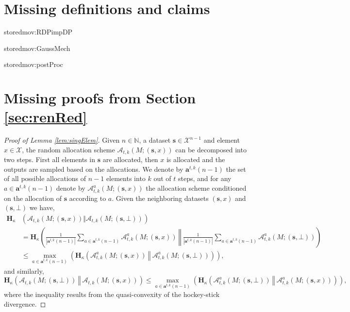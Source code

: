 \documentclass{article}
\newcommand{\showstored}[1]{\csname stored#1\endcsname}
\theoremstyle{plain}
\theoremstyle{definition}
\newcommand{\naturals}{\mathbb{N}}
\newcommand{\alg}{M}
\newcommand{\domain}{\mathcal{X}}
\newcommand{\dataset}{\boldsymbol{s}}
\newcommand{\HockeyStick}[1]{\boldsymbol{H}_{#1}}
\newcommand{\HockeyStickDiv}[3]{\HockeyStick{#1}\left(#2 ~\left\Vert~ #3 \right. \right)}
\newcommand{\allocFunc}[3]{\mathcal{A}_{#1}\left(#2; #3\right)}
\begin{document}
\section{Missing definitions and claims} \label{apd:prem}

\showstored{mov:RDPimpDP}

\showstored{mov:GaussMech}

\showstored{mov:postProc}

\fi

\section{Missing proofs from Section \ref{sec:renRed}} \label{apd:renRed}

\begin{proof}[Proof of Lemma \ref{lem:singElem}]
    Given $n \in \naturals$, a dataset $\dataset \in \domain^{n-1}$ and element $x \in \domain$, the random allocation scheme $\allocFunc{t, k}{\alg}{(\dataset, x)}$ can be decomposed into two steps. First all elements in $\dataset$ are allocated, then $x$ is allocated and the outputs are sampled based on the allocations. We denote by $\boldsymbol{a}^{t, k}(n-1)$ the set of all possible allocations of $n-1$ elements into $k$ out of $t$ steps, and for any $a \in \boldsymbol{a}^{t, k}(n-1)$ denote by $\mathcal{A}_{t, k}^{a}(\alg; (\dataset, x))$ the allocation scheme conditioned on the allocation of $\dataset$ according to $a$. Given the neighboring datasets $(\dataset, x)$ and $(\dataset, \bot)$ we have,
    \begin{align*}
        \HockeyStick{\kappa} & \left(\allocFunc{t, k}{\alg}{(\dataset, x)} \Vert \allocFunc{t, k}{\alg}{(\dataset, \bot)} \right) 
        \\ & = \HockeyStickDiv{\kappa}{\frac{1}{\left\vert \boldsymbol{a}^{t, k}(n-1) \right\vert} \sum_{a \in \boldsymbol{a}^{t, k}(n-1)} \mathcal{A}_{t, k}^{a}(\alg; (\dataset, x))}{\frac{1}{\left\vert \boldsymbol{a}^{t, k}(n-1) \right\vert} \sum_{a \in \boldsymbol{a}^{t, k}(n-1)} \mathcal{A}_{t, k}^{a}(\alg; (\dataset, \bot))}
        \\ & \le \underset{a \in \boldsymbol{a}^{t, k}(n-1)}{\max} \left(\HockeyStickDiv{\kappa}{\mathcal{A}_{t, k}^{a}(\alg; (\dataset, x))}{\mathcal{A}_{t, k}^{a}(\alg; (\dataset, \bot))}\right),
    \end{align*}
    and similarly,
    \[
        \HockeyStickDiv{\kappa}{\allocFunc{t, k}{\alg}{(\dataset, \bot)}}{\allocFunc{t, k}{\alg}{(\dataset, x)}} \le \underset{a \in \boldsymbol{a}^{t, k}(n-1)}{\max} \left(\HockeyStickDiv{\kappa}{\mathcal{A}_{t, k}^{a}(\alg; (\dataset, \bot))}{\mathcal{A}_{t, k}^{a}(\alg; (\dataset, x))}\right),
    \]
    where the inequality results from the quasi-convexity of the hockey-stick divergence.


\end{proof}
\end{document}
